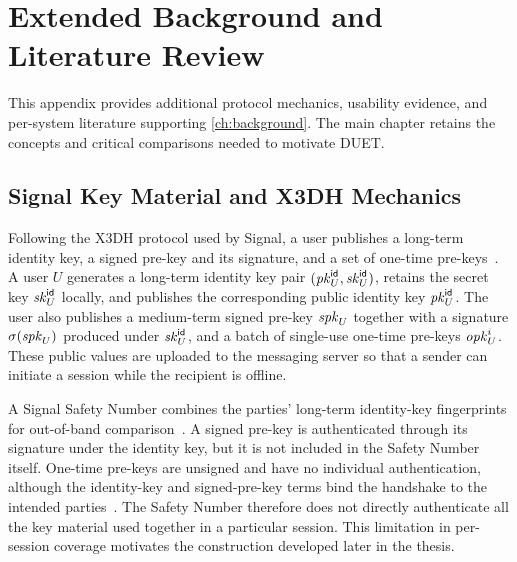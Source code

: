 \chapter{Extended Background and Literature Review}\label{app:extended-background}

This appendix provides additional protocol mechanics, usability evidence, and per-system literature
supporting \cref{ch:background}. The main chapter retains the concepts and critical comparisons needed
to motivate DUET.

\section{Signal Key Material and X3DH Mechanics}\label{sec:ext-signal}

Following the X3DH protocol used by Signal, a user publishes a long-term identity key, a signed
pre-key and its signature, and a set of one-time pre-keys~\cite[Sections~2.4 and 3.2]{x3dh}. A user $U$ generates a long-term identity key pair
$(\pkid{U},\skid{U})$, retains the secret key $\skid{U}$ locally, and publishes the corresponding
public identity key $\pkid{U}$. The user also publishes a medium-term signed pre-key $\spk{U}$
together with a signature $\sig{\spk{U}}$ produced under $\skid{U}$, and a batch of single-use
one-time pre-keys $\opk{U}{i}$. These public values are uploaded to the messaging server so that a
sender can initiate a session while the recipient is offline.

A Signal Safety Number combines the parties' long-term identity-key fingerprints for out-of-band
comparison~\cite{safetynumbers}. A signed pre-key is authenticated through its signature under the
identity key, but it is not included in the Safety Number itself. One-time pre-keys are unsigned and
have no individual authentication, although the identity-key and signed-pre-key terms bind the
handshake to the intended parties~\cite[Sections~3.2--3.3]{x3dh}. The Safety Number therefore does
not directly authenticate all the key material used together in a particular session. This
limitation in per-session coverage motivates the construction developed later in the thesis.

